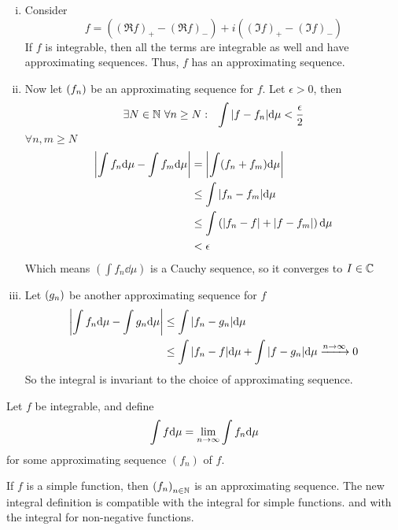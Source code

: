 \documentclass[../../script.tex]{subfiles}
\begin{document}
\begin{rem}
\begin{enumerate}[(i)]
        \item Consider 
        \[
            f = \left(\left(\Re f\right)_+ - \left(\Re f\right)_-\right) + i\left(\left(\Im f\right)_+ - \left(\Im f\right)_-\right)
        \]
        If $f$ is integrable, then all the terms are integrable as well and have approximating sequences. Thus, $f$ has an approximating sequence.

        \item Now let $\left(f_n\right)$ be an approximating sequence for $f$. Let $\epsilon > 0$, then 
        \[
            \exists N \in \mathbb{N} ~\forall n \ge N: ~~\int \abs{f - f_n} \dd\mu < \frac{\epsilon}{2}
        \]
        $\forall n, m \ge N$
        \begin{align*}
            \abs{\int f_n \dd\mu - \int f_m \dd\mu} &= \abs{\int (f_n + f_m) \dd\mu} \\
            &\le \int \abs{f_n - f_m} \dd\mu \\
            &\le \int \left( \abs{f_n - f} + \abs{f - f_m}\right) \dd\mu \\
            &< \epsilon
        \end{align*}
        Which means $(\int f_n \dd\mu)$ is a Cauchy sequence, so it converges to $I \in \mathbb{C}$

        \item Let $\left(g_n\right)$ be another approximating sequence for $f$
        \begin{align*}
            \abs{\int f_n \dd\mu - \int g_n \dd\mu} &\le \int \abs{f_n - g_n} \dd\mu \\
            &\le \int \abs{f_n - f} \dd\mu + \int \abs{f - g_n} \dd\mu \conv{n \rightarrow \infty} 0
        \end{align*}
        So the integral is invariant to the choice of approximating sequence.
    \end{enumerate}
\end{rem}

\begin{defi}
    Let $f$ be integrable, and define 
    \[
        \int f \dd\mu = \lim_{n \rightarrow \infty} \int f_n \dd\mu 
    \]
    for some approximating sequence $(f_n)$ of $f$.
\end{defi}

\begin{rem}
    If $f$ is a simple function, then $\left(f_n\right)_{n \in \mathbb{N}}$ is an approximating sequence.
    The new integral definition is compatible with the integral for simple functions. and with the integral for non-negative functions.
\end{rem}
\end{document}
